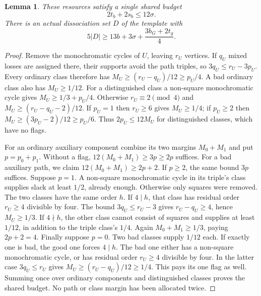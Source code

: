 \documentclass[11pt]{article}
\newtheorem{lemma}[theorem]{Lemma}
\begin{document}
\begin{lemma}\label{lem:joint-margin}
These resources satisfy a single shared budget
\[
 2t_b+2s_b\le12\sigma.
\]
There is an actual dissociation set $D$ of the template with
\begin{equation}\label{eq:joint-template}
 5|D|\ge13b+3\sigma+\frac{3b_G+2t_g}{4}.
\end{equation}
\end{lemma}
\begin{proof}
Remove the monochromatic cycles of $U$, leaving $r_U$ vertices. If $q_U$
mixed losses are assigned there, their supports avoid the path triples,
so $3q_U\le r_U-3p_U$. Every ordinary class therefore has
$M_U\ge(r_U-q_U)/12\ge p_U/4$. A bad ordinary class also has
$M_U\ge1/12$. For a distinguished class a non-square monochromatic
cycle gives $M_U\ge1/3+p_U/4$. Otherwise $r_U\equiv2\pmod4$ and
$M_U\ge(r_U-q_U-2)/12$. If $p_U=1$ then $r_U\ge6$ gives $M_U\ge1/4$;
if $p_U\ge2$ then $M_U\ge(3p_U-2)/12\ge p_U/6$.
Thus $2p_U\le12M_U$ for distinguished classes, which have no flags.

For an ordinary auxiliary component combine its two margins $M_0+M_1$
and put $p=p_0+p_1$. Without a flag, $12(M_0+M_1)\ge3p\ge2p$ suffices.
For a bad auxiliary path, we claim $12(M_0+M_1)\ge2p+2$.
If $p\ge2$, the same bound $3p$ suffices. Suppose $p=1$.
A non-square monochromatic cycle in its triple's class supplies slack
at least $1/2$, already enough. Otherwise only squares were removed.
The two classes have the same order $h$. If $4\mid h$, that class has
residual order $r_U\ge4$ divisible by four. The bound
$3q_U\le r_U-3$ gives $r_U-q_U\ge4$, hence $M_U\ge1/3$.
If $4\nmid h$, the other class cannot consist of squares and supplies
at least $1/12$, in addition to the triple class's $1/4$.
Again $M_0+M_1\ge1/3$, paying $2p+2=4$.
Finally suppose $p=0$. Two bad classes supply $1/12$ each. If exactly
one is bad, the good one forces $4\mid h$. The bad one either has a
non-square monochromatic cycle, or has residual order $r_U\ge4$
divisible by four. In the latter case $3q_U\le r_U$ gives
$M_U\ge(r_U-q_U)/12\ge1/4$. This pays its one flag as well.
Summing once over ordinary components and distinguished classes proves
the shared budget. No path or class margin has been allocated twice.


\end{proof}
\end{document}
